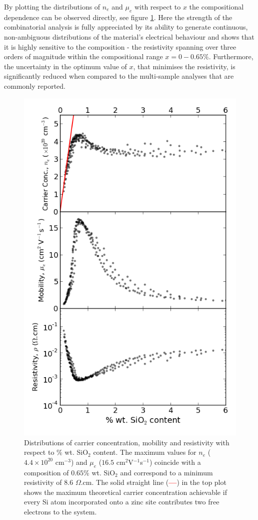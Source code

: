 \documentclass[final,5p,times]{elsarticle}
\begin{document}
By plotting the distributions of $n_e$ and $\mu_e$ with respect to $x$ the compositional dependence can be observed directly, see figure \ref{fig:6}. Here the strength of the combinatorial analysis is fully appreciated by its ability to generate continuous, non-ambiguous distributions of the material's electrical behaviour and shows that it is highly sensitive to the composition - the resistivity spanning over three orders of magnitude within the compositional range $x = 0 - 0.65\%$. Furthermore, the uncertainty in the optimum value of $x$, that minimises the resistivity, is significantly reduced when compared to the multi-sample analyses that are commonly reported. 
\begin{figure}[bt!]
\centering
\includegraphics[width = 1\columnwidth]{figure_6.png}
\caption{\label{fig:6} Distributions of carrier concentration, mobility and resistivity with respect to \% wt. SiO$_{2}$ content. The maximum values for $n_e$ ($4.4\times10^{20}$ cm$^{-3}$) and $\mu_{e}$ ($16.5$ cm$^{2}$V$^{-1}$s$^{-1}$) coincide with a composition of $0.65$\% wt. SiO$_{2}$ and correspond to a minimum resistivity of $8.6$ $\Omega$.cm. The solid straight line (\textcolor{red}{\textbf{---}}) in the top plot shows the maximum theoretical carrier concentration achievable if every Si atom incorporated onto a zinc site contributes two free electrons to the system.}
\end{figure}
\end{document}
